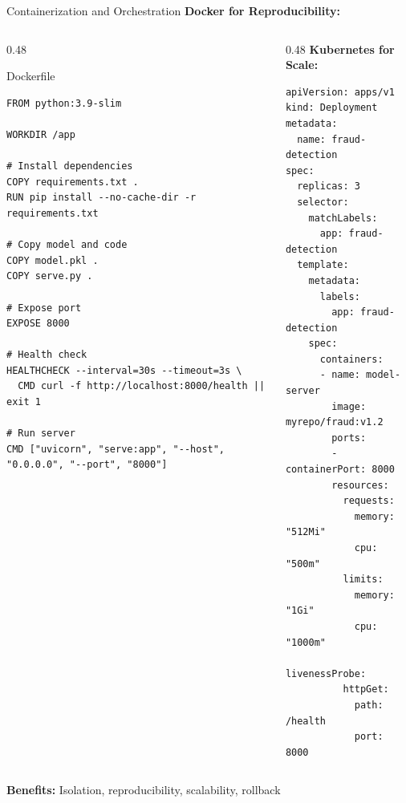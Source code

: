 \begin{frame}{Containerization and Orchestration}
\textbf{Docker for Reproducibility:}
\begin{columns}
\begin{column}{0.48\textwidth}
\begin{block}{Dockerfile}
\tiny
\begin{verbatim}
FROM python:3.9-slim

WORKDIR /app

# Install dependencies
COPY requirements.txt .
RUN pip install --no-cache-dir -r requirements.txt

# Copy model and code
COPY model.pkl .
COPY serve.py .

# Expose port
EXPOSE 8000

# Health check
HEALTHCHECK --interval=30s --timeout=3s \
  CMD curl -f http://localhost:8000/health || exit 1

# Run server
CMD ["uvicorn", "serve:app", "--host", "0.0.0.0", "--port", "8000"]
\end{verbatim}
\end{block}
\end{column}

\begin{column}{0.48\textwidth}
\textbf{Kubernetes for Scale:}
\tiny
\begin{verbatim}
apiVersion: apps/v1
kind: Deployment
metadata:
  name: fraud-detection
spec:
  replicas: 3
  selector:
    matchLabels:
      app: fraud-detection
  template:
    metadata:
      labels:
        app: fraud-detection
    spec:
      containers:
      - name: model-server
        image: myrepo/fraud:v1.2
        ports:
        - containerPort: 8000
        resources:
          requests:
            memory: "512Mi"
            cpu: "500m"
          limits:
            memory: "1Gi"
            cpu: "1000m"
        livenessProbe:
          httpGet:
            path: /health
            port: 8000
\end{verbatim}
\end{column}
\end{columns}

\vspace{0.2cm}
\textbf{Benefits:} Isolation, reproducibility, scalability, rollback
\end{frame}

